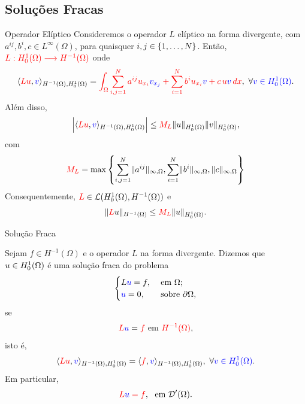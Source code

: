 \subsection*{Soluções Fracas}
\begin{frame}{Operador Elíptico}
Consideremos o operador {\color{red}\(L\)} elíptico na forma divergente,{\color{red} com \(a^{ij},b^i, c\in L^\infty(\Omega)\)}, para quaisquer \(i,j\in \{1,\ldots,N\}\). Então, 
\({\color{red}L:H_0^1(\Omega)\longrightarrow H^{-1}(\Omega)}\) onde
\[
\langle{\color{red}Lu},{\color{blue}v}\rangle_{H^{-1}(\Omega),H_0^1(\Omega)}=
{\color{red}\int_\Omega \sum_{i,j=1}^{N} a^{ij}u_{x_i}{\color{blue}v_{x_j}}+\sum_{i=1}^{N} b^iu_{x_i}{\color{blue}v}+c\,u{\color{blue}v}\,dx
},\ \forall {\color{blue}v\in H_0^1(\Omega)}.
\]
Além disso, 
\[
\left|\langle{\color{red}Lu},{\color{blue}v}\rangle_{H^{-1}(\Omega),H_0^1(\Omega)}
\right|\leq {\color{red}M_L}\lVert u\rVert_{H_0^1(\Omega)}\lVert v\rVert_{H_0^1(\Omega)},
\]
com 
\begin{equation}\label{ML}
{\color{red}M_L}=\max\left\{ \sum_{i,j=1}^{N} \lVert a^{ij}\rVert_{\infty,\Omega},\sum_{i=1}^{N} \lVert b^{i}\rVert_{\infty,\Omega}, \lVert c\rVert_{\infty,\Omega}\right\}
\end{equation}
 Consequentemente, \({\color{red}L}\in \mathcal{L}(H_0^1(\Omega),H^{-1}(\Omega))\) e
\[
\lVert{\color{red}L}u\rVert_{H^{-1}(\Omega)}\leq {\color{red}M_L} \lVert u\rVert_{H_0^1(\Omega)}.
\]


\end{frame}

\begin{frame}{Solução Fraca}
\begin{defin}
Sejam {\color{red} \(f\in H^{-1}(\Omega)\)} e o operador {\color{red} \(L\)} na forma divergente. Dizemos que {\color{blue}\(u\in H_0^1(\Omega)\)} é uma {\color{blue}solução fraca} do problema 
{\color{red}
\begin{equation}\label{pb-eliptico}  
\begin{cases}
{L}{\color{blue}u}=f, & \text{ em } \Omega;\\
{\color{blue}u}=0, & \text{ sobre } \partial \Omega,
\end{cases}
\end{equation}
}
se 
\[
{\color{red}L}{\color{blue}u}={\color{red}f} \text{ em } {\color{red}H^{-1}(\Omega)},
\]
isto é, 
\[
\innp{{\color{red}Lu},{\color{blue}v}}_{\hd,\ho}
=\innp{{\color{red}f},{\color{black}{\color{blue}v}}}_{\hd,\ho}, \ \forall {\color{blue}v\in \ho}.
\]
Em particular, 
\[{\color{red}L{\color{blue}u}={\color{red}f}},\ \text{ em } \D'(\Omega). \]
\end{defin}
\end{frame}

